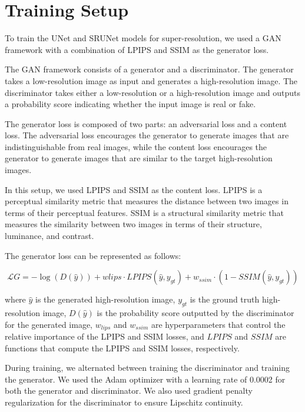 \section{Training Setup}

To train the UNet and SRUNet models for super-resolution, we used a GAN framework with a combination of LPIPS and SSIM as the generator loss.

The GAN framework consists of a generator and a discriminator. The generator takes a low-resolution image as input and generates a high-resolution image. The discriminator takes either a low-resolution or a high-resolution image and outputs a probability score indicating whether the input image is real or fake.

The generator loss is composed of two parts: an adversarial loss and a content loss. The adversarial loss encourages the generator to generate images that are indistinguishable from real images, while the content loss encourages the generator to generate images that are similar to the target high-resolution images.

In this setup, we used LPIPS and SSIM as the content loss. LPIPS is a perceptual similarity metric that measures the distance between two images in terms of their perceptual features. SSIM is a structural similarity metric that measures the similarity between two images in terms of their structure, luminance, and contrast.

The generator loss can be represented as follows:

$$\mathcal{L}{G} = -\log(D(\hat{y})) + w{lips}\cdot LPIPS(\hat{y}, y_{gt}) + w_{ssim} \cdot (1 - SSIM(\hat{y}, y_{gt}))$$

where $\hat{y}$ is the generated high-resolution image, $y_{gt}$ is the ground truth high-resolution image, $D(\hat{y})$ is the probability score outputted by the discriminator for the generated image, $w_{lips}$ and $w_{ssim}$ are hyperparameters that control the relative importance of the LPIPS and SSIM losses, and $LPIPS$ and $SSIM$ are functions that compute the LPIPS and SSIM losses, respectively.

During training, we alternated between training the discriminator and training the generator. We used the Adam optimizer with a learning rate of 0.0002 for both the generator and discriminator. We also used gradient penalty regularization for the discriminator to ensure Lipschitz continuity.


